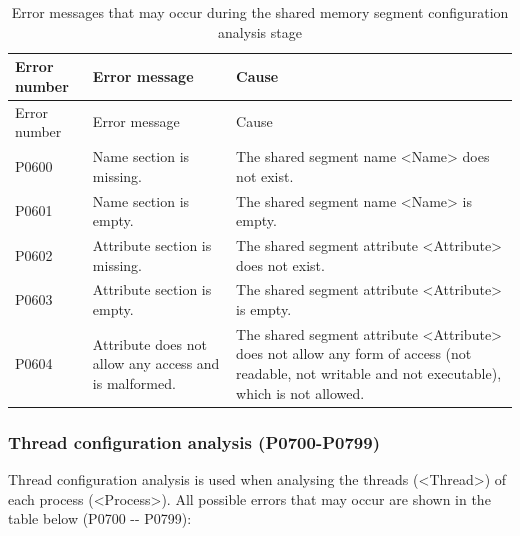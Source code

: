 \begin{xltabular}{\textwidth}{@{}>{\hsize\raggedright\arraybackslash}X>{\hsize\raggedright\arraybackslash}X>{\hsize\raggedright\arraybackslash}X@{}}
\caption{Error messages that may occur during the shared memory segment configuration analysis stage}\label{tab:5-9}\\
\toprule
Error number & Error message & Cause\tabularnewline
\endfirsthead
\toprule
Error number & Error message & Cause\tabularnewline
\midrule
\endhead
\bottomrule
\endlastfoot
P0600 & Name section is missing. &
The shared segment name <Name> does not exist.\tabularnewline
P0601 & Name section is empty. &
The shared segment name <Name> is empty.\tabularnewline
P0602 & Attribute section is missing. &
The shared segment attribute <Attribute> does not exist.\tabularnewline
P0603 & Attribute section is empty. &
The shared segment attribute <Attribute> is empty.\tabularnewline
P0604 & Attribute does not allow any access and is malformed. &
The shared segment attribute <Attribute> does not allow any form of access (not readable, not writable and not executable), which is not allowed.\tabularnewline
\end{xltabular}

\subsubsection{Thread configuration analysis (P0700-P0799)}\label{subsubsec:5-6-2-8}

Thread configuration analysis is used when analysing the threads (<Thread>) of each process (<Process>). All possible errors that may occur are shown in the table below (P0700
-\/- P0799):

